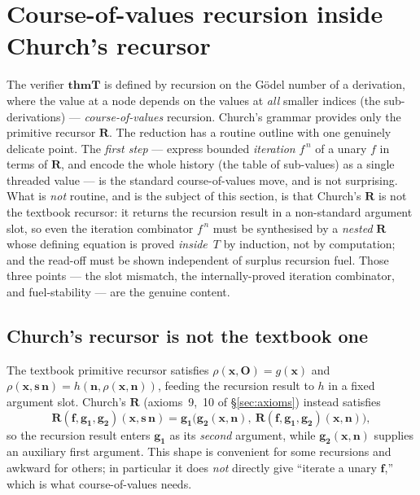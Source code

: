 \documentclass[11pt]{article}
\theoremstyle{plain}
\theoremstyle{definition}
\theoremstyle{remark}
\newcommand{\thmT}{\mathbf{thmT}}
\begin{document}
\section{Course-of-values recursion inside Church's recursor}
\label{sec:cov}

The verifier $\thmT$ is defined by recursion on the G\"odel number of a
derivation, where the value at a node depends on the values at
\emph{all} smaller indices (the sub-derivations) --- \emph{course-of-values}
recursion.  Church's grammar provides only the primitive recursor
$\mathbf{R}$.  The reduction has a routine outline with one genuinely
delicate point.  The \emph{first step} --- express bounded \emph{iteration}
$f^{\,n}$ of a unary $f$ in terms of $\mathbf{R}$, and encode the whole
history (the table of sub-values) as a single threaded value --- is the
standard course-of-values move, and is not surprising.  What is \emph{not}
routine, and is the subject of this section, is that Church's $\mathbf{R}$
is not the textbook recursor: it returns the recursion result in a
non-standard argument slot, so even the iteration combinator $f^{\,n}$ must
be synthesised by a \emph{nested} $\mathbf{R}$ whose defining equation is
proved \emph{inside}~$T$ by induction, not by computation; and the read-off
must be shown independent of surplus recursion fuel.  Those three points
--- the slot mismatch, the internally-proved iteration combinator, and
fuel-stability --- are the genuine content.

\subsection{Church's recursor is not the textbook one}

The textbook primitive recursor satisfies $\rho(\mathbf{x},\mathbf{O}) =
g(\mathbf{x})$ and $\rho(\mathbf{x},\mathbf{s}\,\mathbf{n}) =
h(\mathbf{n}, \rho(\mathbf{x},\mathbf{n}))$, feeding the recursion result
to $h$ in a fixed argument slot.  Church's $\mathbf{R}$ (axioms~9,~10 of
{\S}\ref{sec:axioms}) instead satisfies
\[
\mathbf{R}(\mathbf{f},\mathbf{g_1},\mathbf{g_2})(\mathbf{x},\mathbf{s}\,\mathbf{n}) = \mathbf{g_1}\bigl(\mathbf{g_2}(\mathbf{x},\mathbf{n}),\ \mathbf{R}(\mathbf{f},\mathbf{g_1},\mathbf{g_2})(\mathbf{x},\mathbf{n})\bigr),
\]
so the recursion result enters $\mathbf{g_1}$ as its \emph{second}
argument, while $\mathbf{g_2}(\mathbf{x},\mathbf{n})$ supplies an
auxiliary first argument.  This shape is convenient for some recursions
and awkward for others; in particular it does \emph{not} directly give
``iterate a unary $\mathbf{f}$,'' which is what course-of-values needs.
\end{document}
